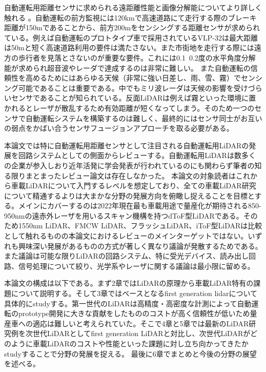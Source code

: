 \documentclass[letterpaper, 10 pt, conference]{ieeeconf}  %
\begin{document}
自動運転用距離センサに求められる遠距離性能と画像分解能についてより詳しく触れる
。自動運転の前方監視には120kmで高速道路にて走行する際のブレーキ距離が150mであることから、前方200mをセンシングする距離センサが求められている。例えば自動運転のプロトタイプ車で採用されているVLP-32\cite{velodyne, velopatent}は最大距離は50mと短く高速道路利用の要件は満たさない。また市街地を走行する際には遠方の歩行者を見落とさないのが重要な要件。これには0.1~0.2度の水平角度分解能が求められ超音波やレーダ\cite{mitomo201077}\cite{lee2010fully}で達成するのは非常に難しい。
また自動運転の信頼性を高めるためにはあらゆる天候（非常に強い日差し、雨、雪、霧）でセンシング可能であることは重要である。中でもミリ波レーダは天候の影響を受けづらいセンサであることが知られている。反面LiDARは例えば霧といった環境に置かれるとレーザが散乱するため有効距離が短くなってしまう。そのため一つのセンサで自動運転システムを構築するのは難しく、最終的にはセンサ同士がお互いの弱点をかばい合うセンサフュージョンアプローチを取る必要がある\cite{yeong2021sensor, loufusion}。

本論文では特に自動運転用距離センサとして注目される自動運転用LiDARの発展を回路システムとしての側面からレビューする。自動運転用LiDARは数多くの企業が参入しおり近年活発に学会発表が行われているのにも関わらず筆者の知る限りまとまったレビュー論文は存在しなかった。
本論文の対象読者はこれから車載LiDARについて入門するレベルを想定しており、全ての車載LiDAR研究について精通するよりは大まかな分野の発展方向を俯瞰し捉えることを目標とする。メインにカバーするのは2022年現在最も車載用途で量産化が期待される850-950nmの遠赤外レーザを用いるスキャン機構を持つdToF型LiDARである\cite{niclass2012100, niclass2008128, niclass20130, yoshioka201820, yoshioka201820ch, kondo2020automotive, ta20202d, akita2017imager, ito2013system, liu201960, kumagai2021189x600, ito2020back, seo2021direct}。そのため1550nm LiDAR\cite{chung202119}、FMCW LiDAR\cite{behroozpour201611, poulton2017coherent}、フラッシュLiDAR\cite{ximenes2018256, padmanabhan20217, lindner2018252}、iToF型LiDAR\cite{kawahito2007cmos, bamji20140, bamji2018impixel, keel2019vga}は比較として触れるものの本論文におけるレビューのメインターゲットではない。いずれも興味深い発展があるものの方式が著しく異なり議論が発散するためである。また議論は可能な限りLiDARの回路システム、特に受光デバイス、読み出し回路、信号処理について絞り、光学系やレーザに関する議論は最小限に留める。

本論文の構成は以下である。まず2章ではLiDARの原理から車載LiDAR特有の課題について説明する。そして3章ではベースとなるfirst generation lidarについて具体的にstudyする。第一世代のLiDARは高精度・高密度な計測によって自動運転のprototype開発に大きな貢献をしたもののコストが高く信頼性が低いため量産車への適応は難しいと考えられていた。そこで4章と5章では最新のLiDAR研究例を次世代LiDARとしてfirst generation LiDARと対比し、次世代LiDARがどのように車載LiDARのコストや性能といった課題に対し立ち向かってきたかstudyすることで分野の発展を捉える。
最後に6章でまとめと今後の分野の展望を述べる。
\end{document}
